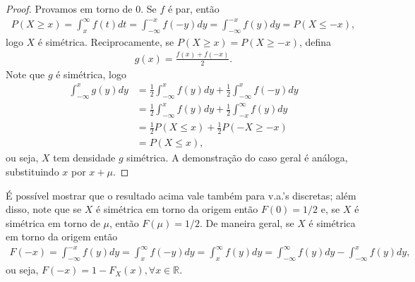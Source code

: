 \documentclass[../Notas.tex]{subfiles}
\begin{document}
\begin{proof}
Provamos em torno de 0. Se $f$ é par, então
\begin{align*}
    P(X\geq x) = \int_x^{\infty} f(t)dt = \int_{-\infty}^{-x} f(-y)dy = \int_{-\infty}^{-x} f(y)dy = P(X\leq -x),
\end{align*}
logo $X$ é simétrica. Reciprocamente, se $P(X\geq x) = P(X\geq -x)$, defina
\begin{align*}
    g(x) = \frac{f(x) + f(-x)}{2}.
\end{align*}
Note que $g$ é simétrica, logo
\begin{align*}
    \int_{-\infty}^x g(y) dy &= \frac{1}{2}\int_{-\infty}^x f(y) dy + \frac{1}{2}\int_{-\infty}^x f(-y) dy \\
    &= \frac{1}{2}\int_{-\infty}^x f(y) dy + \frac{1}{2}\int_{-x}^{\infty} f(y) dy \\
    &= \frac{1}{2}P(X\leq x) + \frac{1}{2}P(-X\geq -x) \\
    &= P(X\leq x),
\end{align*}
ou seja, $X$ tem densidade $g$ simétrica. A demonstração do caso geral é análoga, substituindo $x$ por $x+\mu$.
\end{proof}

\begin{remark}
É possível mostrar que o resultado acima vale também para v.a.'s discretas; além disso, note que se $X$ é simétrica em torno da origem então $F(0) = 1/2$ e, se $X$ é simétrica em torno de $\mu$, então $F(\mu) = 1/2$. De maneira geral, se $X$ é simétrica em torno da origem então
\begin{align*}
    F(-x) = \int_{-\infty}^{-x}f(y) dy = \int_x^{\infty} f(-y)dy = \int_x^{\infty} f(y) dy = \int_{-\infty}^{\infty} f(y) dy - \int_{-\infty}^x f(y) dy,
\end{align*}
ou seja, $F(-x) = 1 - F_X(x), \forall x\in\mathbb{R}$.
\end{remark}
\end{document}
